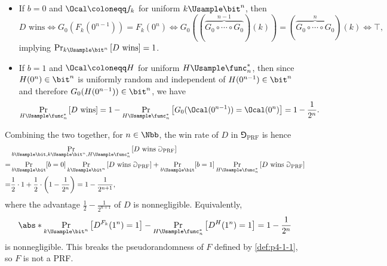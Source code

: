 \begin{answer}[a]
\begin{itemize}
        \item If $b=0$ and $\Ocal \coloneqq f_{k}$ for uniform $k\Usample\bit^{n}$, then
        \[
            D \textrm{ wins}\iff G_0(F_k(0^{n-1})) = F_k(0^n)
            \iff G_0((\overbrace{G_0 \circ \cdots\circ G_0}^{n-1})(k)) = (\overbrace{G_0 \circ \cdots\circ G_0}^{n})(k)
            \iff \top,
        \]
        implying $\Pr_{k\Usample\bit^{n}}\left[D \textrm{ wins} \right]=1$.
        \item If $b=1$ and $\Ocal \coloneqq H$ for uniform $H\Usample\func_n^\ast$, then since $H(0^n)\in\bit^n$ is uniformly random and independent of $H(0^{n-1})\in\bit^n$ and therefore $G_0(H(0^{n-1}))\in\bit^n$, we have
        \[
            \Pr_{H\Usample\func_n^\ast}\left[D \textrm{ wins} \right]
            = 1-  \Pr_{H\Usample\func_n^\ast}\left[G_0(\Ocal(0^{n-1})) = \Ocal(0^n) \right]
            = 1- \frac{1}{2^n}.
        \]
    \end{itemize}
    Combining the two together, for $n\in\Nbb$, the win rate of $D$ in $\Game_{\textrm{PRF}}$ is hence
    \begin{align*}
        &\Pr_{b\Usample\bit, k\Usample\bit^{n}, H\Usample\func_n^\ast}\left[D \textrm{ wins } \Game_{\textrm{PRF}} \right]\\
        =& \Pr_{b\Usample\bit}[b=0]  \Pr_{k\Usample\bit^{n}}\left[D \textrm{ wins } \Game_{\textrm{PRF}} \right]
        + \Pr_{b\Usample\bit}[b=1] \Pr_{H\Usample\func_n^\ast}\left[D \textrm{ wins } \Game_{\textrm{PRF}} \right]\\
        =& \frac{1}{2}\cdot 1+\frac{1}{2}\cdot \left( 1- \frac{1}{2^n} \right)
        = 1-\frac{1}{2^{n+1}},
    \end{align*}
    where the advantage $\frac{1}{2}-\frac{1}{2^{n+1}}$ of $D$ is nonnegligible. Equivalently,
    \[
        \abs*{\Pr_{k\Usample\bit^n}\left[D^{F_k}(1^n)=1\right] - \Pr_{H\Usample\func_n^\ast}\left[D^{H}(1^n)=1\right]}
        = 1-\frac{1}{2^n}
    \]
    is nonnegligible.
    This breaks the pseudorandomness of $F$ defined by \autoref{def:p4-1-1}, so $F$ is not a PRF.
\end{answer}









